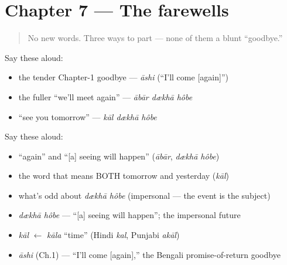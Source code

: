 \section[Practice]{Chapter 7 — The farewells}

\label{lesson:BN-C04-practice}



\begin{quote}
No new words. Three ways to part — none of them a blunt \textquotedblleft{}goodbye.\textquotedblright{}
\end{quote}

\begin{culture}
Say these aloud:

\begin{itemize}
\raggedright
  \item the tender Chapter-1 goodbye — \emph{āshi} (\textquotedblleft{}I'll come {[}again{]}\textquotedblright{})
  \item the fuller \textquotedblleft{}we'll meet again\textquotedblright{} — \emph{ābār dækhā hôbe}
  \item \textquotedblleft{}see you tomorrow\textquotedblright{} — \emph{kāl dækhā hôbe}
\end{itemize}
\end{culture}

\begin{cousinweb}
Say these aloud:

\begin{itemize}
\raggedright
  \item \textquotedblleft{}again\textquotedblright{} and \textquotedblleft{}{[}a{]} seeing will happen\textquotedblright{} (\emph{ābār}, \emph{dækhā hôbe})
  \item the word that means BOTH tomorrow and yesterday (\emph{kāl})
  \item what's odd about \emph{dækhā hôbe} (impersonal — the event is the subject)
\end{itemize}
\end{cousinweb}

\begin{grammarlens}[title={What you've built — roots you now carry}]
\begin{itemize}
\raggedright
  \item \emph{dækhā hôbe} — \textquotedblleft{}{[}a{]} seeing will happen\textquotedblright{}; the impersonal future
  \item \emph{kāl} $\leftarrow$ \emph{kāla} \textquotedblleft{}time\textquotedblright{} (Hindi \emph{kal}, Punjabi \emph{akāl})
  \item \emph{āshi} (Ch.1) — \textquotedblleft{}I'll come {[}again{]},\textquotedblright{} the Bengali promise-of-return goodbye
\end{itemize}
\end{grammarlens}


